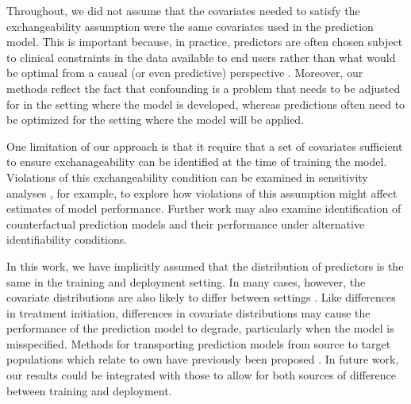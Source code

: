 Throughout, we did not assume that the covariates needed to satisfy the exchangeability assumption were the same covariates used in the prediction model. This is important because, in practice,  predictors are often chosen subject to clinical constraints in the data available to end users rather than what would be optimal from a causal (or even predictive) perspective \cite{steyerberg_clinical_2019}. Moreover, our methods reflect the fact that confounding is a problem that needs to be adjusted for in the setting where the model is developed, whereas predictions often need to be optimized for the setting where the model will be applied. 

One limitation of our approach is that it require that a set of covariates sufficient to ensure exchanageability can be identified at the time of training the model. Violations of this exchangeability condition can be examined in sensitivity analyses \cite{robins_sensitivity_2000}, for example, to explore how violations of this assumption might affect estimates of model performance. Further work may also examine identification of counterfactual prediction models and their performance under alternative identifiability conditions.

In this work, we have implicitly assumed that the distribution of predictors is the same in the training and deployment setting. In many cases, however, the covariate distributions are also likely to differ between settings \cite{bickel_discriminative_2009, sugiyama_covariate_2007}. Like differences in treatment initiation, differences in covariate distributions may cause the performance of the prediction model to degrade, particularly when the model is misspecified. Methods for transporting prediction models from source to target populations which relate to own have previously been proposed \cite{steingrimsson_extending_2022, steingrimsson_transporting_2023, li_estimating_2022, morrison_robust_2022}. In future work,  our results could be integrated with those to allow for both sources of difference between training and deployment.

